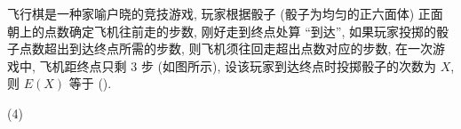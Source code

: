 \begin{example}
    \begin{minipage}[t]{0.68\linewidth}
    飞行棋是一种家喻户晓的竞技游戏, 玩家根据骰子 (骰子为均匀的正六面体) 正面朝上的点数确定飞机往前走的步数, 刚好走到终点处算 “到达”, 如果玩家投掷的骰子点数超出到达终点所需的步数, 则飞机须往回走超出点数对应的步数, 在一次游戏中, 飞机距终点只剩 3 步 (如图所示), 设该玩家到达终点时投掷骰子的次数为 $X$, 则 $E(X)$ 等于 (\quad).
    \begin{tasks}(4)
    \end{tasks}
    \end{minipage}
    \begin{minipage}[t]{0.28\linewidth}
        \begin{figure}[H]
            \centering
            \begin{tikzpicture}[x=0.75pt,y=0.75pt,yscale=-1,xscale=1]
                

\end{tikzpicture}
\end{figure}
\end{minipage}
\end{example}

